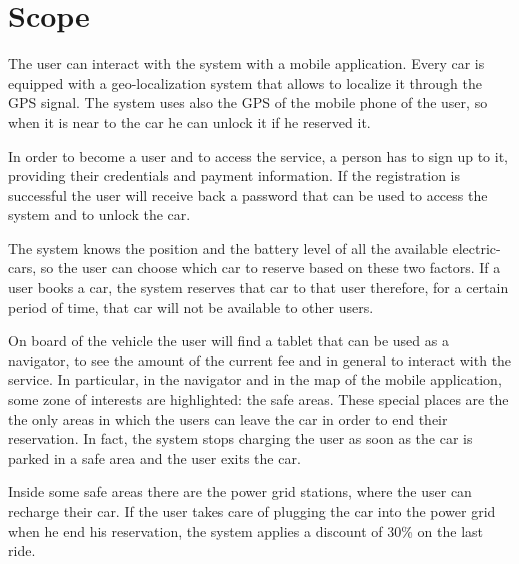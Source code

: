 \section{Scope}
The user can interact with the system with a mobile application.
Every car is equipped with a geo-localization system that allows to localize it through the GPS signal.
The system uses also the GPS of the mobile phone of the user, so when it is near to the car he can unlock it if he reserved it.

In order to become a user and to access the service, a person has to sign up to it, providing their credentials and payment information. If the registration is successful the user will receive back a password that can be used to access the system and to unlock the car.

The system knows the position and the battery level of all the available electric-cars, so the user can choose which car to reserve based on these two factors. If a user books a car, the system reserves that car to that user therefore, for a certain period of time, that car will not be available to other users.

On board of the vehicle the user will find a tablet that can be used as a navigator, to see the amount of the current fee and in general to interact with the service. In particular, in the navigator and in the map of the mobile application, some zone of interests are highlighted: the safe areas. These special places are the the only areas in which the users can leave the car in order to end their reservation. In fact, the system stops charging the user as soon as the car is parked in a safe area and the user exits the car.

Inside some safe areas there are the power grid stations, where the user can recharge their car. If the user takes care of plugging the car into the power grid when he end his reservation, the system applies a discount of 30\% on the last ride.
